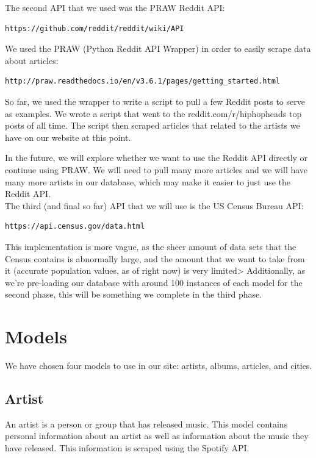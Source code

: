 \documentclass{scrartcl}
\begin{document}
\noindent
The second API that we used was the PRAW Reddit API:
\begin{verbatim}https://github.com/reddit/reddit/wiki/API\end{verbatim}

\noindent
We used the PRAW (Python Reddit API Wrapper) in order to easily scrape data about articles:
\begin{verbatim}http://praw.readthedocs.io/en/v3.6.1/pages/getting_started.html\end{verbatim}

So far, we used the wrapper to write a script to pull a few Reddit posts to serve as examples. We wrote a script that went to the reddit.com/r/hiphopheads top posts of all time. The script then scraped articles that related to the artists we have on our website at this point.

In the future, we will explore whether we want to use the Reddit API directly or continue using PRAW. We will need to pull many more articles and we will have many more artists in our database, which may make it easier to just use the Reddit API.\\

\noindent
The third (and final so far) API that we will use is the US Census Bureau API:
\begin{verbatim}https://api.census.gov/data.html\end{verbatim}

This implementation is more vague, as the sheer amount of data sets that the Census contains is abnormally large, and the amount that we want to take from it (accurate population values, as of right now) is very limited> Additionally, as we're pre-loading our database with around 100 instances of each model for the second phase, this will be something we complete in the third phase.

\section{Models}
We have chosen four models to use in our site: artists, albums, articles, and cities.

\subsection{Artist}
An artist is a person or group that has released music. This model contains personal information about an artist as well as information about the music they have released. This information is scraped using the Spotify API.\\
\end{document}
